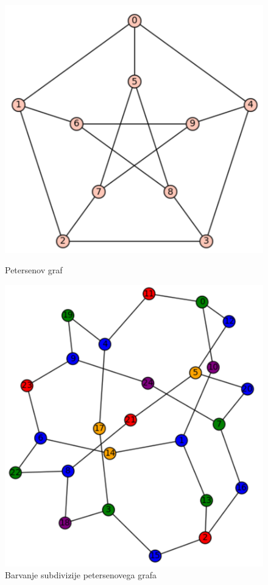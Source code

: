 \documentclass[11pt,a4paper,titlepage]{article}
\begin{document}
\begin{figure}[h]
	\centering
	\begin{minipage}{0.45\textwidth}
		\centering
		\includegraphics[width=\linewidth]{petersen_graph.png}
		\caption{Petersenov graf}
	\end{minipage}
	\hfill
	\begin{minipage}{0.45\textwidth}
		\centering
		\includegraphics[width=\linewidth]{subdivizija_petersen_graph.png}
		\caption{Barvanje subdivizije petersenovega grafa}
	\end{minipage}
\end{figure}
\end{document}
